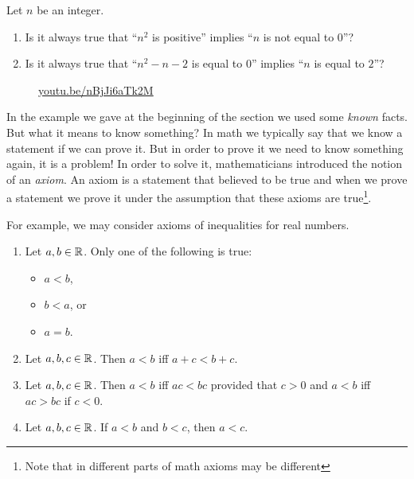 \begin{exercise}
  Let $n$ be an integer.
  \begin{enumerate}
    \item Is it always true that ``$n^2$ is positive''
      implies ``$n$ is not equal to $0$''?
    \item Is it always true that ``$n^2 - n - 2$ is equal to $0$'' implies
      ``$n$ is equal to $2$''?
  \end{enumerate}
\end{exercise}

\begin{wrapfigure}{r}{4cm}
  \begin{center}
    \vskip -0.5cm
    \vskip 0.25cm
    \href{https://youtu.be/nBjJi6aTk2M}{youtu.be/nBjJi6aTk2M}
  \end{center}
  \vskip -1cm
\end{wrapfigure}

In the example we gave at the beginning of the section we used some
\textit{known} facts. But what it means to know something? In math we typically
say that we know a statement if we can prove it. But in order to prove it we
need to know something again, it is a problem! In order to solve it,
mathematicians introduced the notion of an \textit{axiom}.
An axiom is a statement that believed to be true and when we prove a statement
we prove it under the assumption that these axioms are true\footnote{Note that
in different parts of math axioms may be different}.

For example, we may consider axioms of inequalities for real numbers.
\begin{enumerate}
  \item Let $a, b \in \mathbb{R}$. Only one of the following is true:
    \begin{itemize}
      \item $a < b$,
      \item $b < a$, or
      \item $a = b$.
    \end{itemize}
  \item Let $a, b, c \in \mathbb{R}$. Then $a < b$ iff $a + c < b + c$.
  \item Let $a, b, c \in \mathbb{R}$. Then $a < b$ iff $ac < bc$ provided
    that $c > 0$ and $a < b$ iff $ac > bc$ if $c < 0$.
  \item Let $a, b, c \in \mathbb{R}$. If $a < b$ and $b < c$, then $a < c$.
\end{enumerate}

